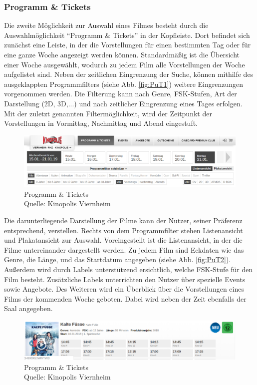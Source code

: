 	\subsubsection{Programm \& Tickets}
	Die zweite Möglichkeit zur Auswahl eines Filmes besteht durch die Auswahlmöglichkeit \enquote{Programm \& Tickets} in der Kopfleiste. Dort befindet sich zunächst eine Leiste, in der die Vorstellungen für einen bestimmten Tag oder für eine ganze Woche angezeigt werden können. Standardmäßig ist die Übersicht einer Woche ausgewählt, wodurch zu jedem Film alle Vorstellungen der Woche aufgelistet sind. Neben der zeitlichen Eingrenzung der Suche, können mithilfe des ausgeklappten Programmfilters (siehe Abb. \vref{fig:PuT1}) weitere Eingrenzungen vorgenommen werden. Die Filterung kann nach Genre, FSK-Stufen, Art der Darstellung (2D, 3D,...) und nach zeitlicher Eingrenzung eines Tages erfolgen. Mit der zuletzt genannten Filtermöglichkeit, wird der Zeitpunkt der Vorstellungen in Vormittag, Nachmittag und Abend eingestuft.
	\begin{figure}[H]
		\centering 
		\includegraphics[width=14cm]{img/PuT_1.png}
		\captionsetup{format=hang}
		\centering\caption[Programm \& Tickets]{\label{fig:PuT1}Programm \& Tickets \\Quelle: Kinopolis Viernheim}
	\end{figure}
	
	Die darunterliegende Darstellung der Filme kann der Nutzer, seiner Präferenz entsprechend, verstellen. Rechts von dem Programmfilter stehen Listenansicht und Plakatansicht zur Auswahl. Voreingestellt ist die Listenansicht, in der die Filme untereinander dargestellt werden. Zu jedem Film sind Eckdaten wie das Genre, die Länge, und das Startdatum angegeben (siehe Abb. \vref{fig:PuT2}). Außerdem wird durch Labels unterstützend ersichtlich, welche FSK-Stufe für den Film besteht. Zusätzliche Labels unterrichten den Nutzer über spezielle Events sowie Angebote. Des Weiteren wird ein Überblick über die Vorstellungen eines Films der kommenden Woche geboten. Dabei wird neben der Zeit ebenfalls der Saal angegeben. 
	\begin{figure}[H]
		\centering 
		\includegraphics[width=14cm]{img/PuT_2.png}
		\captionsetup{format=hang}
		\centering\caption[Programm \& Tickets 2]{\label{fig:PuT2}Programm \& Tickets \\Quelle: Kinopolis Viernheim}
	\end{figure}
	
